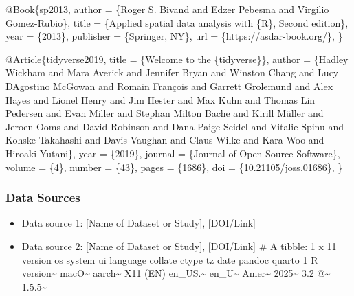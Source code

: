 \documentclass[
]{article}
\newenvironment{Shaded}{\begin{snugshade}}{\end{snugshade}}
\newcommand{\DataTypeTok}[1]{\textcolor[rgb]{0.13,0.29,0.53}{#1}}
\newcommand{\NormalTok}[1]{#1}
\newcommand{\OtherTok}[1]{\textcolor[rgb]{0.56,0.35,0.01}{#1}}
\newcommand{\VariableTok}[1]{\textcolor[rgb]{0.00,0.00,0.00}{#1}}
\providecommand{\tightlist}{%
  \setlength{\itemsep}{0pt}\setlength{\parskip}{0pt}}
\begin{document}
\begin{Shaded}
\begin{Highlighting}[]
\VariableTok{@Book}\NormalTok{\{}\OtherTok{sp2013}\NormalTok{,}
  \DataTypeTok{author}\NormalTok{ = \{Roger S. Bivand and Edzer Pebesma and Virgilio Gomez{-}Rubio\},}
  \DataTypeTok{title}\NormalTok{ = \{Applied spatial data analysis with \{R\}, Second edition\},}
  \DataTypeTok{year}\NormalTok{ = \{2013\},}
  \DataTypeTok{publisher}\NormalTok{ = \{Springer, NY\},}
  \DataTypeTok{url}\NormalTok{ = \{https://asdar{-}book.org/\},}
\NormalTok{\}}

\VariableTok{@Article}\NormalTok{\{}\OtherTok{tidyverse2019}\NormalTok{,}
  \DataTypeTok{title}\NormalTok{ = \{Welcome to the \{tidyverse\}\},}
  \DataTypeTok{author}\NormalTok{ = \{Hadley Wickham and Mara Averick and Jennifer Bryan and Winston Chang and Lucy D\textquotesingle{}Agostino McGowan and Romain François and Garrett Grolemund and Alex Hayes and Lionel Henry and Jim Hester and Max Kuhn and Thomas Lin Pedersen and Evan Miller and Stephan Milton Bache and Kirill Müller and Jeroen Ooms and David Robinson and Dana Paige Seidel and Vitalie Spinu and Kohske Takahashi and Davis Vaughan and Claus Wilke and Kara Woo and Hiroaki Yutani\},}
  \DataTypeTok{year}\NormalTok{ = \{2019\},}
  \DataTypeTok{journal}\NormalTok{ = \{Journal of Open Source Software\},}
  \DataTypeTok{volume}\NormalTok{ = \{4\},}
  \DataTypeTok{number}\NormalTok{ = \{43\},}
  \DataTypeTok{pages}\NormalTok{ = \{1686\},}
  \DataTypeTok{doi}\NormalTok{ = \{10.21105/joss.01686\},}
\NormalTok{\}}
\end{Highlighting}
\end{Shaded}

\subsubsection{Data Sources}\label{data-sources}

\begin{itemize}
\tightlist
\item
  Data source 1: {[}Name of Dataset or Study{]}, {[}DOI/Link{]}
\item
  Data source 2: {[}Name of Dataset or Study{]}, {[}DOI/Link{]} \# A
  tibble: 1 x 11 version os system ui language collate ctype tz date
  pandoc quarto 1 R version\textasciitilde{} macO\textasciitilde{}
  aarch\textasciitilde{} X11 (EN) en\_US.\textasciitilde{}
  en\_U\textasciitilde{} Amer\textasciitilde{} 2025\textasciitilde{} 3.2
  @\textasciitilde{} 1.5.5\textasciitilde{}
\end{itemize}
\end{document}
